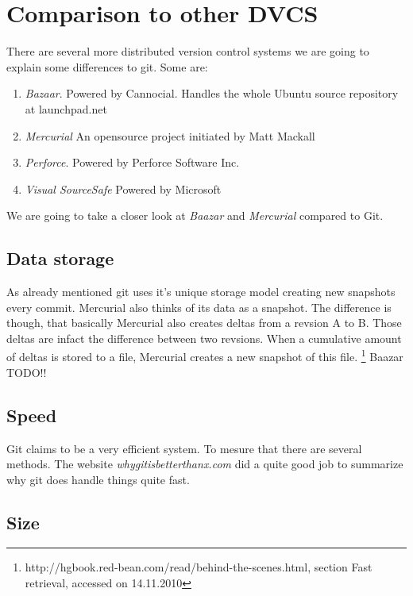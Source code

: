 \section {Comparison to other DVCS}

There are several more distributed version control systems
we are going to explain some differences to git.
Some are:

  \begin{enumerate}
     \item \emph{Bazaar}. Powered by Cannocial. Handles the whole Ubuntu source
     repository at launchpad.net
     \item \emph{Mercurial} An opensource project initiated by Matt Mackall
     \item \emph{Perforce}. Powered by Perforce Software Inc.
     \item \emph{Visual SourceSafe} Powered by Microsoft
  \end{enumerate}
  
We are going to take a closer look at \emph{Baazar} and \emph{Mercurial}
compared to Git.

\subsection {Data storage}

As already mentioned git uses it's unique storage model creating new snapshots
every commit. Mercurial also thinks of its data as a snapshot. The difference
is though, that basically Mercurial also creates deltas from a revsion A to B.
Those deltas are infact the difference between two revsions. When a cumulative
amount of deltas is stored to a file, Mercurial creates a new snapshot of this file. 
\footnote{\cite {hgbook2009}
http://hgbook.red-bean.com/read/behind-the-scenes.html, section Fast retrieval,
accessed on 14.11.2010}
Baazar TODO!!

\subsection {Speed}

Git claims to be a very efficient system. To mesure that there are several
methods. The website \emph{whygitisbetterthanx.com} did a quite good job to
summarize why git does handle things quite fast.

\subsection {Size}

